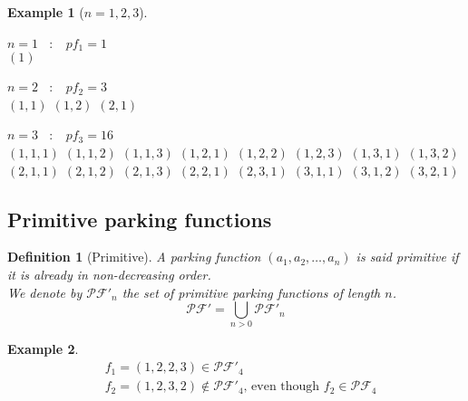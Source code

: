 \documentclass[12pt]{report}
\newtheorem{definition}{Definition}
\newtheorem*{example}{Example}
\begin{document}
\begin{example}[$n = 1, 2, 3$]
    ~\\
    \begin{itemize*}
            \item $n = 1$ \  $:$ \  $pf_1 = 1$\\
            \subitem $(1)$\\
            \item $n = 2$ \  $:$ \  $pf_2 = 3$\\
            \subitem $(1, 1)$
            \subitem $(1, 2)$
            \subitem $(2, 1)$\\
            \item $n = 3$ \  $:$ \  $pf_3 = 16$\\
            \subitem $(1, 1, 1)$
            \subitem $(1, 1, 2)$
            \subitem $(1, 1, 3)$
            \subitem $(1, 2, 1)$
            \subitem $(1, 2, 2)$
            \subitem $(1, 2, 3)$
            \subitem $(1, 3, 1)$
            \subitem $(1, 3, 2)$
            \subitem $(2, 1, 1)$
            \subitem $(2, 1, 2)$
            \subitem $(2, 1, 3)$
            \subitem $(2, 2, 1)$
            \subitem $(2, 3, 1)$
            \subitem $(3, 1, 1)$
            \subitem $(3, 1, 2)$
            \subitem $(3, 2, 1)$\\
    \end{itemize*}
\end{example}

\subsection{Primitive parking functions}

\begin{definition}[Primitive]
    A parking function $(a_1, a_2, \ldots, a_n)$ is said \emph{primitive} if
    it is already in non-decreasing order. \\
    We denote by $\mathcal{PF'}_n$ the set of primitive parking functions of length $n$.
    $$\mathcal{PF'} = \bigcup_{n > 0}{\mathcal{PF'}_n}$$
    
\end{definition}

\begin{example}
    \begin{align*}
        &f_1 = (1, 2, 2, 3) \in \mathcal{PF'}_4\\
        &f_2 = (1, 2, 3, 2) \notin \mathcal{PF'}_4
         \text{, even though } f_2 \in \mathcal{PF}_4\\
    \end{align*}
\end{example}
\end{document}
